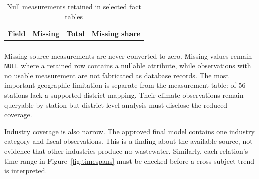 \begin{table}[H]
\centering
\caption{Null measurements retained in selected fact tables}
\label{tab:missing-measurements}
\begin{tabular}{L{0.38\textwidth}r r r}
\toprule
Field & Missing & Total & Missing share \\
\midrule
{}
\bottomrule
\end{tabular}
\end{table}

Missing source measurements are never converted to zero. Missing values remain
\texttt{NULL} where a retained row contains a nullable attribute, while
observations with no usable measurement are not fabricated as database records.
The most important geographic limitation is separate from the measurement table:
\mUnmappedStations{} of 56 stations lack a supported district mapping.
Their climate observations remain queryable by station but district-level
analysis must disclose the reduced coverage.

Industry coverage is also narrow. The approved final model contains one
industry category and \mIndustryRows{} fiscal observations. This is a finding
about the available source, not evidence that other industries produce no
wastewater. Similarly, each relation's time range in
Figure~\ref{fig:timespans} must be checked before a cross-subject trend is
interpreted.
